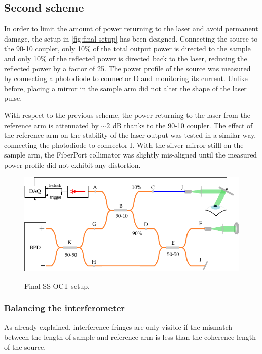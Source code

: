 \subsection{Second scheme}
In order to limit the amount of power returning to the laser and avoid permanent damage, the setup in \autoref{fig:final-setup} has been designed. Connecting the source to the 90-10 coupler, only 10\% of the total output power is directed to the sample and only 10\% of the reflected power is directed back to the laser, reducing the reflected power by a factor of 25. The power profile of the source was measured by connecting a photodiode to connector D and monitoring its current. Unlike before, placing a mirror in the sample arm did not alter the shape of the laser pulse. 

With respect to the previous scheme, the power returning to the laser from the reference arm is attenuated by $\sim 2$ dB thanks to the 90-10 coupler. 
The effect of the reference arm on the stability of the laser output was tested in a similar way, connecting the photodiode to connector I. With the silver mirror stilll on the sample arm, the FiberPort collimator was slightly mis-aligned until the measured power profile did not exhibit any distortion. 

\begin{figure}[bth]
	\myfloatalign
	{\includegraphics[width=\linewidth]{gfx/setup-diagrams/final-setup-2.pdf}}
	\caption{Final SS-OCT setup.}\label{fig:final-setup}
\end{figure}

\subsubsection{Balancing the interferometer}
As already explained, interference fringes are only visible if the mismatch between the length of sample and reference arm is less than the coherence length of the source.

